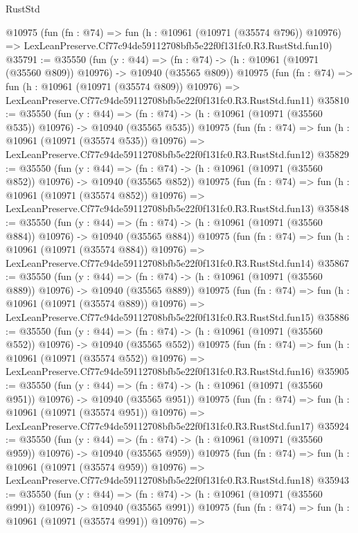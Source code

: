 \begin{lexlean}{RustStd}
\begin{coremodule}
    @10975
    (fun (fn : @74) =>
    fun (h : @10961 (@10971 (@35574 @796)) @10976) =>
    LexLeanPreserve.Cf77c94de59112708bfb5e22f0f131fc0.R3.RustStd.fun10)
@35791 := @35550
    (fun (y : @44) =>
    (fn : @74) -> (h : @10961 (@10971 (@35560 @809)) @10976) -> @10940 (@35565 @809))
    @10975
    (fun (fn : @74) =>
    fun (h : @10961 (@10971 (@35574 @809)) @10976) =>
    LexLeanPreserve.Cf77c94de59112708bfb5e22f0f131fc0.R3.RustStd.fun11)
@35810 := @35550
    (fun (y : @44) =>
    (fn : @74) -> (h : @10961 (@10971 (@35560 @535)) @10976) -> @10940 (@35565 @535))
    @10975
    (fun (fn : @74) =>
    fun (h : @10961 (@10971 (@35574 @535)) @10976) =>
    LexLeanPreserve.Cf77c94de59112708bfb5e22f0f131fc0.R3.RustStd.fun12)
@35829 := @35550
    (fun (y : @44) =>
    (fn : @74) -> (h : @10961 (@10971 (@35560 @852)) @10976) -> @10940 (@35565 @852))
    @10975
    (fun (fn : @74) =>
    fun (h : @10961 (@10971 (@35574 @852)) @10976) =>
    LexLeanPreserve.Cf77c94de59112708bfb5e22f0f131fc0.R3.RustStd.fun13)
@35848 := @35550
    (fun (y : @44) =>
    (fn : @74) -> (h : @10961 (@10971 (@35560 @884)) @10976) -> @10940 (@35565 @884))
    @10975
    (fun (fn : @74) =>
    fun (h : @10961 (@10971 (@35574 @884)) @10976) =>
    LexLeanPreserve.Cf77c94de59112708bfb5e22f0f131fc0.R3.RustStd.fun14)
@35867 := @35550
    (fun (y : @44) =>
    (fn : @74) -> (h : @10961 (@10971 (@35560 @889)) @10976) -> @10940 (@35565 @889))
    @10975
    (fun (fn : @74) =>
    fun (h : @10961 (@10971 (@35574 @889)) @10976) =>
    LexLeanPreserve.Cf77c94de59112708bfb5e22f0f131fc0.R3.RustStd.fun15)
@35886 := @35550
    (fun (y : @44) =>
    (fn : @74) -> (h : @10961 (@10971 (@35560 @552)) @10976) -> @10940 (@35565 @552))
    @10975
    (fun (fn : @74) =>
    fun (h : @10961 (@10971 (@35574 @552)) @10976) =>
    LexLeanPreserve.Cf77c94de59112708bfb5e22f0f131fc0.R3.RustStd.fun16)
@35905 := @35550
    (fun (y : @44) =>
    (fn : @74) -> (h : @10961 (@10971 (@35560 @951)) @10976) -> @10940 (@35565 @951))
    @10975
    (fun (fn : @74) =>
    fun (h : @10961 (@10971 (@35574 @951)) @10976) =>
    LexLeanPreserve.Cf77c94de59112708bfb5e22f0f131fc0.R3.RustStd.fun17)
@35924 := @35550
    (fun (y : @44) =>
    (fn : @74) -> (h : @10961 (@10971 (@35560 @959)) @10976) -> @10940 (@35565 @959))
    @10975
    (fun (fn : @74) =>
    fun (h : @10961 (@10971 (@35574 @959)) @10976) =>
    LexLeanPreserve.Cf77c94de59112708bfb5e22f0f131fc0.R3.RustStd.fun18)
@35943 := @35550
    (fun (y : @44) =>
    (fn : @74) -> (h : @10961 (@10971 (@35560 @991)) @10976) -> @10940 (@35565 @991))
    @10975
    (fun (fn : @74) =>
    fun (h : @10961 (@10971 (@35574 @991)) @10976) =>

\end{coremodule}
\end{lexlean}

